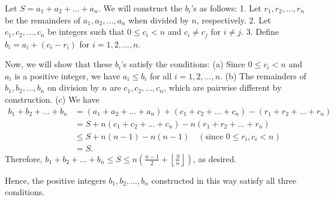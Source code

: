 Let $S = a_1 + a_2 + \dots + a_n$. We will construct the $b_i$'s as follows:
1. Let $r_1, r_2, \dots, r_n$ be the remainders of $a_1, a_2, \dots, a_n$ when divided by $n$, respectively.
2. Let $c_1, c_2, \dots, c_n$ be integers such that $0 \le c_i < n$ and $c_i \neq c_j$ for $i \neq j$.
3. Define $b_i = a_i + (c_i - r_i)$ for $i = 1, 2, \dots, n$.

Now, we will show that these $b_i$'s satisfy the conditions:
(a) Since $0 \le c_i < n$ and $a_i$ is a positive integer, we have $a_i \le b_i$ for all $i = 1, 2, \dots, n$.
(b) The remainders of $b_1, b_2, \dots, b_n$ on division by $n$ are $c_1, c_2, \dots, c_n$, which are pairwise different by construction.
(c) We have
\begin{align*}
b_1 + b_2 + \dots + b_n &= (a_1 + a_2 + \dots + a_n) + (c_1 + c_2 + \dots + c_n) - (r_1 + r_2 + \dots + r_n) \\
&= S + n(c_1 + c_2 + \dots + c_n) - n(r_1 + r_2 + \dots + r_n) \\
&\le S + n(n-1) - n(n-1) \quad (\text{since } 0 \le r_i, c_i < n) \\
&= S.
\end{align*}
Therefore, $b_1 + b_2 + \dots + b_n \le S \le n \left( \frac{n - 1}{2} + \left\lfloor \frac{S}{n} \right\rfloor \right)$, as desired.

Hence, the positive integers $b_1, b_2, \dots, b_n$ constructed in this way satisfy all three conditions.
